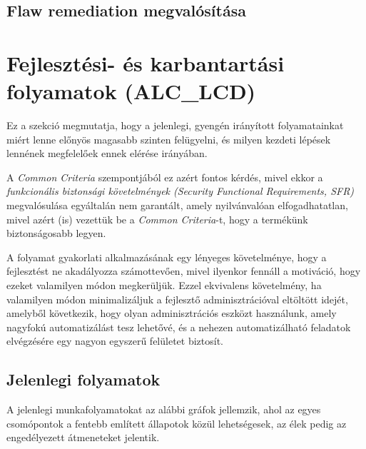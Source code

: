 \subsection{Flaw remediation megvalósítása}


\section{Fejlesztési- és karbantartási folyamatok (ALC\_LCD)}
Ez a szekció megmutatja, hogy a jelenlegi, gyengén irányított folyamatainkat miért lenne előnyös
magasabb szinten felügyelni, és milyen kezdeti lépések lennének megfelelőek ennek elérése irányában.

A \emph{Common Criteria} szempontjából ez azért fontos kérdés, mivel ekkor a
\emph{funkcionális biztonsági követelmények (Security Functional Requirements, SFR)} megvalósulása
egyáltalán nem garantált, amely nyilvánvalóan elfogadhatatlan, mivel azért (is) vezettük be a
\emph{Common Criteria}-t, hogy a termékünk biztonságosabb legyen.

A folyamat gyakorlati alkalmazásának egy lényeges követelménye, hogy a fejlesztést ne akadályozza
számottevően, mivel ilyenkor fennáll a motiváció, hogy ezeket valamilyen módon megkerüljük. Ezzel
ekvivalens követelmény, ha valamilyen módon minimalizáljuk a fejlesztő adminisztrációval eltöltött
idejét, amelyből következik, hogy olyan adminisztrációs eszközt használunk, amely nagyfokú
automatizálást tesz lehetővé, és a nehezen automatizálható feladatok elvégzésére egy nagyon egyszerű
felületet biztosít.

\subsection{Jelenlegi folyamatok}
A jelenlegi munkafolyamatokat az alábbi gráfok jellemzik, ahol az egyes csomópontok a fentebb
említett állapotok közül lehetségesek, az élek pedig az engedélyezett átmeneteket jelentik.


